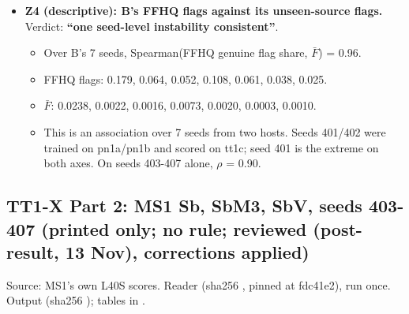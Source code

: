 \documentclass[10pt,twocolumn,letterpaper]{article}
\providecommand{\tightlist}{\setlength{\itemsep}{0pt}\setlength{\parskip}{0pt}}
\begin{document}
\begin{itemize}
  \begin{itemize}
  \tightlist
  \item
    CFP-FF border-reference flag share, Sb against B: 0.118 / 0.014, 0.060 / 0.010, 0.067 / 0.007, 0.029 / 0.000, 0.163 / 0.019.
  \item
    Sb flags more training-source camera photos once a CFP-FF-shaped constant border is blanked in (Sb 0.029-0.163; B 0.000-0.019). On the same photos without the border, both flag 0.000 on all five seeds. The excess is not specific to CFP: Sb - B is +0.026 to +0.060 on MSU-MFSD and +0.026 to +0.048 on Oulu-NPU, and +0.00 to +0.03 elsewhere. CFP-FF is the largest gap on 3 of 5 seeds. This is descriptive and Sb is splice-trained, so it does not show that Sb uses borders on unseen CFP-FF images.
  \item
    R3(c) for CFP-FF (Sb - B) is mixed: -0.074 to +0.082.
  \end{itemize}
\item
  \textbf{Z4 (descriptive): B's FFHQ flags against its unseen-source flags.} Verdict: \textbf{``one seed-level instability consistent''}.

  \begin{itemize}
  \tightlist
  \item
    Over B's 7 seeds, Spearman(FFHQ genuine flag share, \(\bar F\)) = 0.96.
  \item
    FFHQ flags: 0.179, 0.064, 0.052, 0.108, 0.061, 0.038, 0.025.
  \item
    \(\bar F\): 0.0238, 0.0022, 0.0016, 0.0073, 0.0020, 0.0003, 0.0010.
  \item
    This is an association over 7 seeds from two hosts. Seeds 401/402 were trained on pn1a/pn1b and scored on tt1c; seed 401 is the extreme on both axes. On seeds 403-407 alone, \(\rho\) = 0.90.
  \end{itemize}
\end{itemize}

\subsection{TT1-X Part 2: MS1 Sb, SbM3, SbV, seeds 403-407 (printed only; no rule; reviewed (post-result, 13 Nov), corrections applied)}\label{tt1-x-part-2-ms1-sb-sbm3-sbv-seeds-403-407-printed-only-no-rule-reviewed-post-result-13-nov-corrections-applied}

Source: MS1's own L40S scores. Reader \protect{} (sha256 \protect{}, pinned at fdc41e2), run once. Output \protect{} (sha256 \protect{}); tables in \protect{}.
\end{document}
